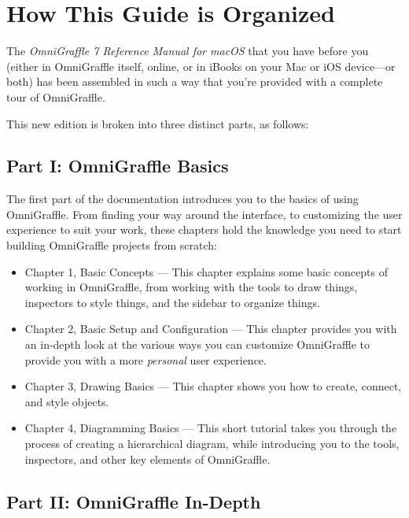 \documentclass[../main.tex]{subfiles}
\begin{document}
\section*{How This Guide is Organized}

The \textit{OmniGraffle 7 Reference Manual for macOS} that you have before you (either in
OmniGraffle itself, online, or in iBooks on your Mac or iOS device---or both) has been
assembled in such a way that you're provided with a complete tour of OmniGraffle.

This new edition is broken into three distinct parts, as follows:

\subsection*{Part I: OmniGraffle Basics}

The first part of the documentation introduces you to the basics of using OmniGraffle. From
finding your way around the interface, to customizing the user experience to suit your work,
these chapters hold the knowledge you need to start building OmniGraffle projects from
scratch:

\begin{itemize}
  \item Chapter 1, Basic Concepts --- This chapter explains some basic concepts of working in
    OmniGraffle, from working with the tools to draw things, inspectors to style things, and the
    sidebar to organize things.
  \item Chapter 2, Basic Setup and Configuration --- This chapter provides you with an in-depth
    look at the various ways you can customize OmniGraffle to provide you with a more
    \textit{personal} user experience.
  \item Chapter 3, Drawing Basics --- This chapter shows you how to create, connect, and style
    objects.
  \item Chapter 4, Diagramming Basics --- This short tutorial takes you through the process of
    creating a hierarchical diagram, while introducing you to the tools, inspectors, and other
    key elements of OmniGraffle.
\end{itemize}

\subsection*{Part II: OmniGraffle In-Depth}
\end{document}

